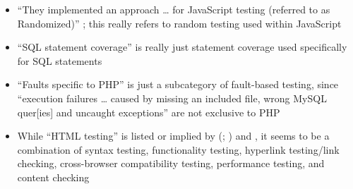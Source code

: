     \begin{itemize}
        \item ``They implemented an approach \dots{} for JavaScript testing
              (referred to as Randomized)'' \citep[p.~192]{DoğanEtAl2014};
              this really refers to random testing used within JavaScript
        \item ``SQL statement coverage'' is really just statement coverage
              used specifically for SQL statements \citep[Tab.~13]{DoğanEtAl2014}
        \item ``Faults specific to PHP'' is just a subcategory of fault-based
              testing, since ``execution failures \dots{} caused by missing an
              included file, wrong MySQL quer[ies] and uncaught exceptions''
              are not exclusive to PHP \citep[Tab.~27]{DoğanEtAl2014}
        \item While ``HTML testing'' is listed or implied by
              \citeauthor{Gerrard2000a} (\citeyear[Tab.~2]{Gerrard2000a};
              \citeyear[Tab.~1, p.~3]{Gerrard2000b}) and
              \citet[p.~220]{Patton2006}, it seems to be a combination of syntax
              testing, functionality testing, hyperlink testing/link checking,
              cross-browser compatibility testing, performance testing, and
              content checking \citep[p.~3]{Gerrard2000b}
    \end{itemize}

